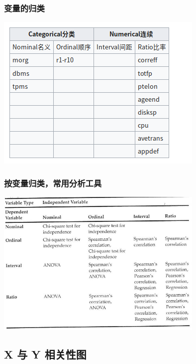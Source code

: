 \hypertarget{ux8fd9ux4e9bux53d8ux91cfux7684ux5f52ux7c7b}{%
\subsubsection{变量的归类}\label{ux8fd9ux4e9bux53d8ux91cfux7684ux5f52ux7c7b}}


\includegraphics[width=10cm]{Screenshotfrom2023-01-0420-20-52.png}

\hypertarget{ux6309ux53d8ux91cfux5f52ux7c7bux5e38ux7528ux5206ux6790ux5de5ux5177}{%
\subsubsection{按变量归类，常用分析工具}\label{ux6309ux53d8ux91cfux5f52ux7c7bux5e38ux7528ux5206ux6790ux5de5ux5177}}


\includegraphics[width=10cm]{maxwell_t68.jpg}

\hypertarget{x-ux4e0e-y-ux76f8ux5173ux6027ux56fe}{%
\subsection{X 与 Y 相关性图}\label{x-ux4e0e-y-ux76f8ux5173ux6027ux56fe}}

